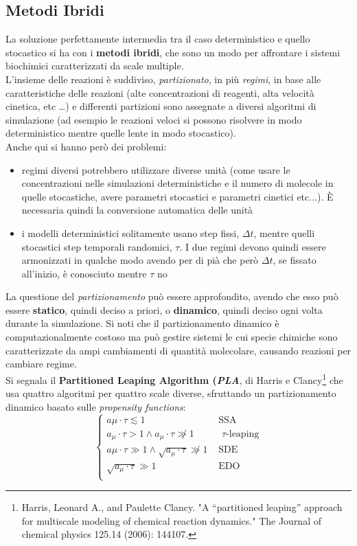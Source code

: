 \documentclass[a4paper,12pt, oneside]{book}
\begin{document}
\subsection{Metodi Ibridi}
La soluzione perfettamente intermedia tra il caso deterministico e quello
stocastico si ha con i \textbf{metodi ibridi}, che sono un modo per affrontare i
sistemi biochimici caratterizzati da scale multiple.\\
L'insieme delle reazioni è suddiviso, \textit{partizionato}, in più
\textit{regimi}, in base alle 
caratteristiche delle reazioni (alte concentrazioni di reagenti,
alta velocità cinetica, etc \ldots) e differenti partizioni sono assegnate a
diversi algoritmi di simulazione (ad esempio le reazioni veloci si possono
risolvere in modo deterministico mentre quelle lente in modo stocastico).\\
Anche qui si hanno però dei problemi:
\begin{itemize}
  \item regimi diversi potrebbero utilizzare diverse unità (come usare le
  concentrazioni nelle simulazioni deterministiche e il numero di molecole in
  quelle stocastiche, avere parametri stocastici e parametri cinetici
  etc$\ldots$). È necessaria quindi la conversione automatica delle unità
  \item i modelli deterministici solitamente usano step fissi, $\Delta t$,
  mentre quelli stocastici step temporali randomici, $\tau$. I due regimi
  devono quindi essere armonizzati in qualche modo avendo per di pià che però
  $\Delta t$, se fissato all'inizio, è conosciuto mentre $\tau$ no
\end{itemize}
La questione del \textit{partizionamento} può essere approfondito, avendo che
esso può essere \textbf{statico}, quindi deciso a priori, o \textbf{dinamico},
quindi deciso ogni volta durante la simulazione. Si noti che il partizionamento
dinamico è computazionalmente costoso ma può gestire sistemi le cui specie
chimiche sono caratterizzate da ampi cambiamenti di quantità molecolare,
causando reazioni per cambiare regime.\\
Si segnala il \textbf{Partitioned Leaping Algorithm (\textit{PLA}}, di Harris e
Clancy\footnote{Harris, Leonard A., and Paulette Clancy. "A “partitioned
  leaping” approach for multiscale modeling of chemical reaction dynamics." The
  Journal of chemical physics 125.14 (2006): 144107.} che usa quattro algoritmi
per quattro scale diverse, sfruttando un partizionamento dinamico basato sulle
\textit{propensity functions}:
\[
  \begin{cases}
    a\mu\cdot\tau \lesssim 1&\mbox{ SSA}\\
    a_\mu\cdot\tau > 1 \land  a_\mu\cdot\tau \not\gg 1 &\mbox{ $\tau$-leaping}\\
    a\mu\cdot\tau\gg 1\land \sqrt{a_\mu\cdot \tau}\not\gg 1 &\mbox{ SDE}\\
    \sqrt{a_\mu\cdot \tau}\gg 1  &\mbox{ EDO}\\
  \end{cases}
\]
\end{document}
